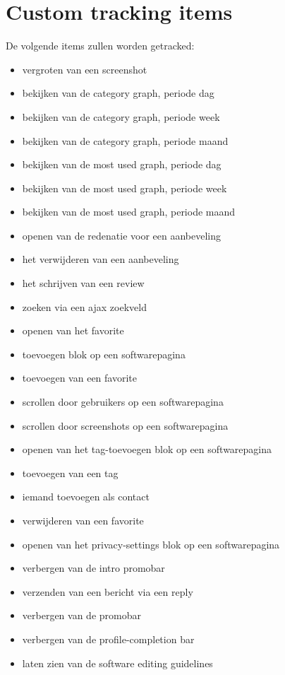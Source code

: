 \chapter{Custom tracking items}
    \label{customtrackingappendix}
     De volgende items zullen worden getracked:
     \begin{itemize}
     \item vergroten van een screenshot
     \item bekijken van de category graph, periode dag
     \item bekijken van de category graph, periode week
     \item bekijken van de category graph, periode maand
     \item bekijken van de most used graph, periode dag
     \item bekijken van de most used graph, periode week
     \item bekijken van de most used graph, periode maand
     \item openen van de redenatie voor een aanbeveling
     \item het verwijderen van een aanbeveling
     \item het schrijven van een review
     \item zoeken via een ajax zoekveld
     \item openen van het favorite
     \item toevoegen blok op een softwarepagina
     \item toevoegen van een favorite
     \item scrollen door gebruikers op een softwarepagina
     \item scrollen door screenshots op een softwarepagina
     \item openen van het tag-toevoegen blok op een softwarepagina
     \item toevoegen van een tag
     \item iemand toevoegen als contact
     \item verwijderen van een favorite
     \item openen van het privacy-settings blok op een softwarepagina
     \item verbergen van de intro promobar
     \item verzenden van een bericht via een reply
     \item verbergen van de promobar
     \item verbergen van de profile-completion bar
     \item laten zien van de software editing guidelines
     \end{itemize}


